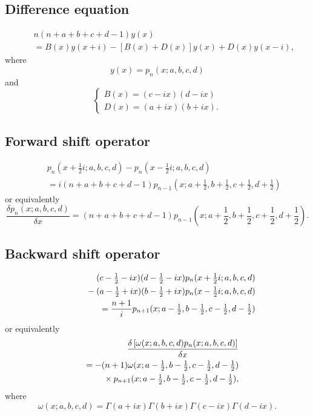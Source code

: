\documentclass[envcountchap,graybox]{svmono}
\newcommand{\mathindent}{\hspace{7.5mm}}
\renewcommand{\Gamma}{\varGamma}
\begin{document}
\subsection*{Difference equation}
\begin{eqnarray}
\label{dvContHahn}
& &n(n+a+b+c+d-1)y(x)\nonumber\\
& &{}=B(x)y(x+i)-\left[B(x)+D(x)\right]y(x)+D(x)y(x-i),
\end{eqnarray}
where
$$y(x)=p_n(x;a,b,c,d)$$
and
$$\left\{\begin{array}{l}
\displaystyle B(x)=(c-ix)(d-ix)\\[5mm]
\displaystyle D(x)=(a+ix)(b+ix).
\end{array}\right.$$

\subsection*{Forward shift operator}
\begin{eqnarray}
\label{shift1ContHahnI}
& &p_n(x+\textstyle\frac{1}{2}i;a,b,c,d)-p_n(x-\textstyle\frac{1}{2}i;a,b,c,d)\nonumber\\
& &{}=i(n+a+b+c+d-1)p_{n-1}(x;a+\textstyle\frac{1}{2},
b+\textstyle\frac{1}{2},c+\textstyle\frac{1}{2},d+\textstyle\frac{1}{2})
\end{eqnarray}
or equivalently
\begin{equation}
\label{shift1ContHahnII}
\frac{\delta p_n(x;a,b,c,d)}{\delta x}=(n+a+b+c+d-1)
p_{n-1}(x;a+\textstyle\frac{1}{2},b+\textstyle\frac{1}{2},
c+\textstyle\frac{1}{2},d+\textstyle\frac{1}{2}).
\end{equation}

\subsection*{Backward shift operator}
\begin{eqnarray}
\label{shift2ContHahnI}
& &(c-\textstyle\frac{1}{2}-ix)(d-\textstyle\frac{1}{2}-ix)
p_n(x+\textstyle\frac{1}{2}i;a,b,c,d)\nonumber\\
& &{}\mathindent{}-(a-\textstyle\frac{1}{2}+ix)(b-\textstyle\frac{1}{2}+ix)
p_n(x-\textstyle\frac{1}{2}i;a,b,c,d)\nonumber\\
& &{}=\frac{n+1}{i}p_{n+1}(x;a-\textstyle\frac{1}{2},
b-\textstyle\frac{1}{2},c-\textstyle\frac{1}{2},d-\textstyle\frac{1}{2})
\end{eqnarray}
or equivalently
\begin{eqnarray}
\label{shift2ContHahnII}
& &\frac{\delta\left[\omega(x;a,b,c,d)p_n(x;a,b,c,d)\right]}{\delta x}\nonumber\\
& &{}=-(n+1)\omega(x;a-\textstyle\frac{1}{2},b-\textstyle\frac{1}{2},
c-\textstyle\frac{1}{2},d-\textstyle\frac{1}{2})\nonumber\\
& &{}\mathindent\times p_{n+1}(x;a-\textstyle\frac{1}{2},b-\textstyle\frac{1}{2},c-\textstyle\frac{1}{2},d-\textstyle\frac{1}{2}),
\end{eqnarray}
where
$$\omega(x;a,b,c,d)=\Gamma(a+ix)\Gamma(b+ix)\Gamma(c-ix)\Gamma(d-ix).$$
\end{document}
